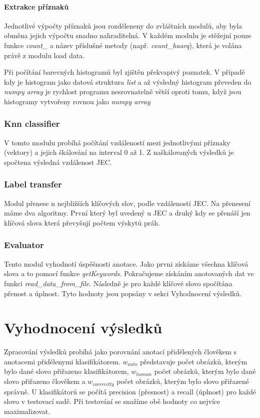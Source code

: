\documentclass[czech,BP]{thesiskiv}
\begin{document}
\subsubsection{Extrakce příznaků}
Jednotlivé výpočty příznaků jsou rozděleneny do zvláštních modulů, aby byla obměna jejich výpočtu snadno nahraditelná. V každém modulu je stěžejní pouze funkce \textit{count\_} a název příslušné metody (např. \textit{count\_haarq}), která je volána právě z modulu load data.


Při počítání barevných histogramů byl zjištěn překvapivý poznatek. V případě kdy je histogram jako datová struktura \textit{list} a až výsledný histogram převeden do \textit{numpy array} je rychlost programu nesrovnatelně větší oproti tomu, když jsou histogramy vytvořeny rovnou jako \textit{numpy array}  
  
\subsection{Knn classifier}
V tomto modulu probíhá počítání vzdáleností mezi jednotlivými příznaky (vektory) a jejich škálování na interval 0 až 1. Z naškálovaných výsledků je spočtena výsledná vzdálenost JEC.    

\subsection{Label transfer}
Modul přenese n nejbližších klíčových slov, podle vzdáleností JEC. Na přenesení máme dva algoritmy. První který byl uvedený u JEC a druhý kdy se přenáší jen klíčová slova která převyšují počtem výskytů práh.   

\subsection{Evaluator}
\par Tento modul vyhodnotí úspěšnosti anotace. Jako prvni získáme všechna klíčová slova a to pomocí funkce \textit{getKeywords}. Pokračujeme získáním anotovaných dat ve funkci \textit{read\_data\_from\_file}.  Následně je pro každé klíčové slovo spočítána přenost a úplnost. Tyto hodnoty jsou popsány v sekci Vyhodnocení výsledků.

\chapter{Vyhodnocení výsledků}
\par Zpracování výsledků probíhá jako porovnání anotací přidělených člověkem s anotacemi přidělenymi klasifikátorem. $w_{auto}$ představuje počet obrázků, kterým bylo dané slovo přiřazeno klasifikátorem, $w_{human}$ počet obrázků, kterým bylo dané slovo přiřazeno člověkem a $w_{corrrectly}$ počet obrázků, kterým bylo slovo přiřazené správně. U klasifikátorů se počítá precision (přesnost) a recall (úplnost) pro každé slovo v testovací sadě. Při testování se snažíme obě hodnoty co nejvíce maximalizovat.
\end{document}
